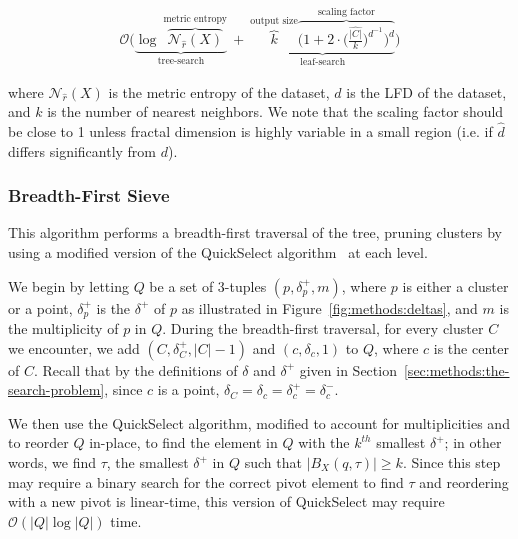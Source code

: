 \begin{gather}
    \mathcal{O}
    \Bigg(
        \underbrace{
            \log~\overbrace{\mathcal{N}_{\hat{r}}(X)}^{\textrm{metric entropy}}
        }_{\textrm{tree-search}}
        \ + \ 
        \underbrace{
            \overbrace{k}^{\textrm{output size}}
            \overbrace{\bigg( 1 + 2 \cdot \Big( \frac{\hat{|C|}}{k} \Big) ^ {d^{-1}} \bigg)^d}^{\textrm{scaling factor}}
        }_{\textrm{leaf-search}}
    \Bigg)
    \label{eq:methods:repeated-rnn-complexity}
\end{gather}

where $\mathcal{N}_{\hat{r}}(X)$ is the metric entropy of the dataset, $d$ is the LFD of the dataset, and $k$ is the number of nearest neighbors.
We note that the scaling factor should be close to 1 unless fractal dimension is highly variable in a small region (i.e. if $\hat{d}$ differs significantly from $d$).


\subsubsection{Breadth-First Sieve}
\label{sec:methods:knn-search:bredth-first-sieve}

This algorithm performs a breadth-first traversal of the tree, pruning clusters by using a modified version of the QuickSelect algorithm~\cite{hoare1961algorithm} at each level.

We begin by letting $Q$ be a set of 3-tuples $(p, \delta^{+}_{p}, m)$, where $p$ is either a cluster or a point, $\delta^{+}_{p}$ is the $\delta^{+}$ of $p$ as illustrated in Figure~\ref{fig:methods:deltas}, and $m$ is the multiplicity of $p$ in $Q$.
During the breadth-first traversal, for every cluster $C$ we encounter, we add $(C, \delta^{+}_{C}, |C| - 1)$ and $(c, \delta_{c}, 1)$ to $Q$, where $c$ is the center of $C$.
Recall that by the definitions of $\delta$ and $\delta^{+}$ given in Section~\ref{sec:methods:the-search-problem}, since $c$ is a point, $\delta_{C} = \delta_{c} = \delta^{+}_{c} = \delta^{-}_{c}$.

We then use the QuickSelect algorithm, modified to account for multiplicities and to reorder $Q$ in-place, to find the element in $Q$ with the $k^{th}$ smallest $\delta^{+}$; in other words, we find $\tau$, the smallest $\delta^{+}$ in $Q$ such that $\left| B_X(q, \tau) \right| \geq k$.
Since this step may require a binary search for the correct pivot element to find $\tau$ and reordering with a new pivot is linear-time, this version of QuickSelect may require $\mathcal{O}(|Q| \log |Q|)$ time.

